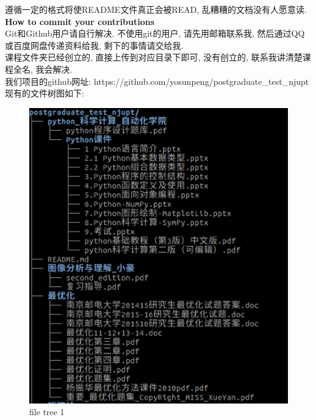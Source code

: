 \documentclass{article}
\begin{document}
\begin{spacing}{1.5}
遵循一定的格式将使README文件真正会被READ, 乱糟糟的文档没有人愿意读. \\
\textbf{How to commit your contributions}\\
Git和Github用户请自行解决.
不使用git的用户, 请先用邮箱联系我, 然后通过QQ或百度网盘传递资料给我, 剩下的事情请交给我. \\
课程文件夹已经创立的, 直接上传到对应目录下即可, 没有创立的, 联系我讲清楚课程全名, 我会解决.\\
我们项目的github网址: https://github.com/yosunpeng/postgraduate\_test\_njupt
现有的文件树图如下: \\
\begin{figure}[h]
\begin{center}
\includegraphics[scale=0.4]{1.eps}
\caption{file tree 1}
\end{center}
\end{figure}


\end{spacing}
\end{document}
